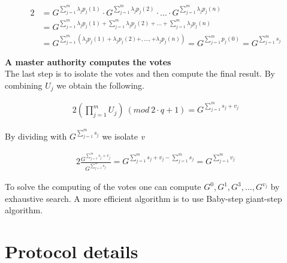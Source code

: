 \begin{alignat*}{2}
&=G^{ \sum\limits_{j=1}^m \lambda_j p_j(1)} \cdot G^{ \sum\limits_{j=1}^m \lambda_j p_j(2)} \cdot...\cdot G^{ \sum\limits_{j=1}^m \lambda_j p_j(n)}\\
&=G^{ \sum\limits_{j=1}^m \lambda_j p_j(1) +  \sum\limits_{j=1}^m \lambda_j p_j(2) +...+  \sum\limits_{j=1}^m \lambda_j p_j(n)}\\
&=G^{ \sum\limits_{j=1}^m (\lambda_j p_j(1)+\lambda_j p_j(2)+,...,+\lambda_{j}p_j(n))} = G^{ \sum\limits_{j=1}^m p_j(0)}= G^{ \sum\limits_{j=1}^m s_j}
\end{alignat*}


\noindent
\textbf{A master authority computes the votes}\\
The last step is to isolate the votes and then compute the final result. By combining \begin{math}U_j \end{math} we obtain the following.

\begin{alignat*}{2}
(\prod\limits_{j=1}^{m} U_{j}) \ (mod \ 2 \cdot q+1)=  G^{ \sum\limits_{j=1}^m s_j +v_j}
\end{alignat*}

\noindent
By dividing with $G^{ \sum\limits_{j=1}^m s_j}$ we isolate \textit{v}

\begin{alignat*}{2}
\frac{G^{ \sum\limits_{j=1}^m s_j +v_j}}{{ G^{ \sum\limits_{j=1}^m s_j} }} =G^{ \sum\limits_{j=1}^m s_j +v_j -\sum\limits_{j=1}^m s_j} = G^{ \sum\limits_{j=1}^m v_j}
\end{alignat*}

\noindent
To solve the computing of the votes one can compute \begin{math}G^0, G^1, G^3,..., G^{v_j} \end{math} by exhaustive search. A more efficient algorithm is to use Baby-step giant-step algorithm. 

\section{Protocol details} \label{sec:protocol_details}

